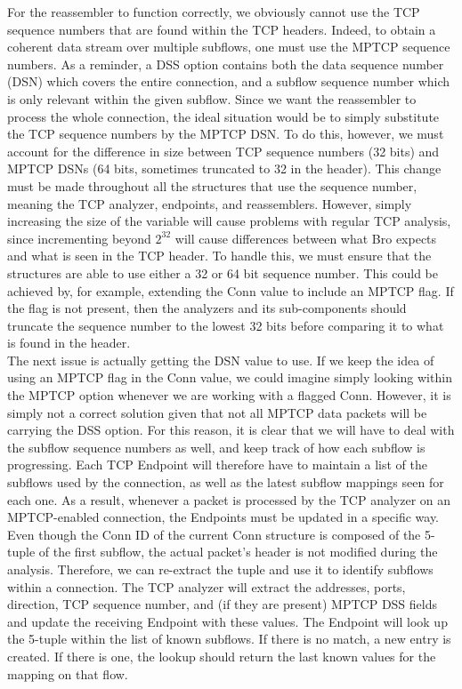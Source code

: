 For the reassembler to function correctly, we obviously cannot use the TCP sequence numbers that are found within the TCP headers. Indeed, to obtain a coherent data stream over multiple subflows, one must use the MPTCP sequence numbers. As a reminder, a DSS option contains both the data sequence number (DSN) which covers the entire connection, and a subflow sequence number which is only relevant within the given subflow. Since we want the reassembler to process the whole connection, the ideal situation would be to simply substitute the TCP sequence numbers by the MPTCP DSN. To do this, however, we must account for the difference in size between TCP sequence numbers (32 bits) and MPTCP DSNs (64 bits, sometimes truncated to 32 in the header). This change must be made throughout all the structures that use the sequence number, meaning the TCP analyzer, endpoints, and reassemblers. However, simply increasing the size of the variable will cause problems with regular TCP analysis, since incrementing beyond $2^{32}$ will cause differences between what Bro expects and what is seen in the TCP header. To handle this, we must ensure that the structures are able to use either a 32 or 64 bit sequence number. This could be achieved by, for example, extending the Conn value to include an MPTCP flag. If the flag is not present, then the analyzers and its sub-components should truncate the sequence number to the lowest 32 bits before comparing it to what is found in the header. \\

The next issue is actually getting the DSN value to use. If we keep the idea of using an MPTCP flag in the Conn value, we could imagine simply looking within the MPTCP option whenever we are working with a flagged Conn. However, it is simply not a correct solution given that not all MPTCP data packets will be carrying the DSS option. For this reason, it is clear that we will have to deal with the subflow sequence numbers as well, and keep track of how each subflow is progressing. Each TCP Endpoint will therefore have to maintain a list of the subflows used by the connection, as well as the latest subflow mappings seen for each one. As a result, whenever a packet is processed by the TCP analyzer on an MPTCP-enabled connection, the Endpoints must be updated in a specific way. Even though the Conn ID of the current Conn structure is composed of the 5-tuple of the first subflow, the actual packet's header is not modified during the analysis. Therefore, we can re-extract the tuple and use it to identify subflows within a connection. The TCP analyzer will extract the addresses, ports, direction, TCP sequence number, and (if they are present) MPTCP DSS fields and update the receiving Endpoint with these values. The Endpoint will look up the 5-tuple within the list of known subflows. If there is no match, a new entry is created. If there is one, the lookup should return the last known values for the mapping on that flow.\\

